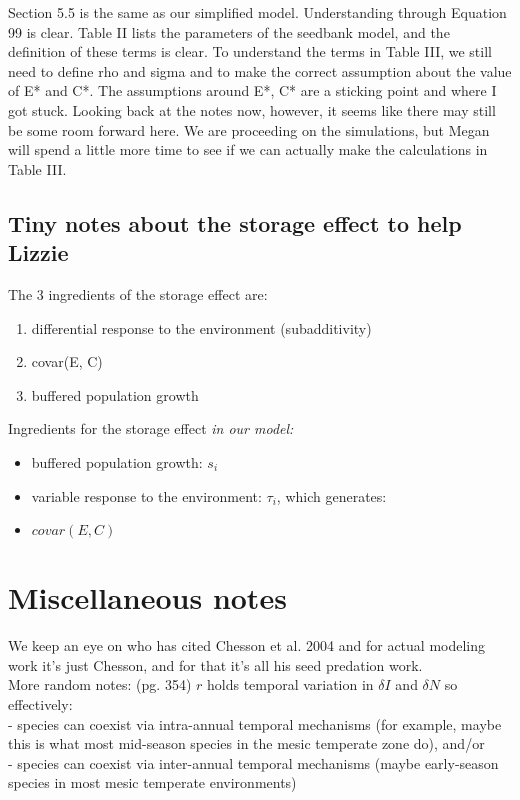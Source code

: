\documentclass[11pt,a4paper,oneside]{article}
\begin{document}
Section 5.5 is the same as our simplified model.  Understanding through Equation 99 is clear.  Table II lists the parameters of the seedbank model, and the definition of these terms is clear.  To understand the terms in Table III, we still need to define rho and sigma and to make the correct assumption about the value of E* and C*.  The assumptions around E*, C* are a sticking point and where I got stuck. 
Looking back at the notes now, however, it seems like there may still be some room forward here.  We are proceeding on the simulations, but Megan will spend a little more time to see if we can actually make the calculations in Table III.

\subsection{Tiny notes about the storage effect to help Lizzie}
\noindent The 3 ingredients of the storage effect are:
\begin{enumerate}
\item differential response to the environment (subadditivity)
\item covar(E, C)
\item buffered population growth
\end{enumerate}

\noindent Ingredients for the storage effect \emph{in our model:}
\begin{itemize}
\item buffered population growth: \(s_{i}\)
\item variable response to the environment: \(\tau_{i}\), which generates:
\item \(covar(E,C)\)
\end{itemize}

\section{Miscellaneous notes}
\noindent We keep an eye on who has cited Chesson et al. 2004
and for actual modeling work it's just Chesson, and for that it's all
his seed predation work.\\

\noindent More random notes: \citet{Chesson:2000vd} (pg. 354) \(r\) holds temporal variation in \(\delta I\) and \(\delta N\) so effectively:\\
- species can coexist via intra-annual temporal mechanisms (for example, maybe this is what most mid-season species in the mesic temperate zone do), and/or\\
- species can coexist via inter-annual temporal mechanisms (maybe early-season species in most mesic temperate environments)\\
\end{document}

